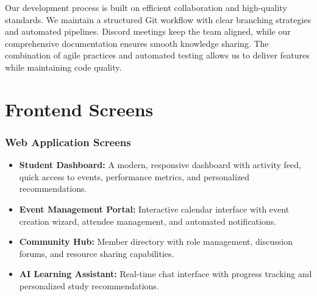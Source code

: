 Our development process is built on efficient collaboration and high-quality standards. We maintain a structured Git workflow with clear branching strategies and automated pipelines. Discord meetings keep the team aligned, while our comprehensive documentation ensures smooth knowledge sharing. The combination of agile practices and automated testing allows us to deliver features while maintaining code quality.

\section{Frontend Screens}
\label{subsec:frontend_screens}

\subsubsection{Web Application Screens}
\label{subsubsec:web_screens}

\begin{itemize}
    \item \textbf{Student Dashboard:} A modern, responsive dashboard with activity feed, quick access to events, performance metrics, and personalized recommendations.
    
    \item \textbf{Event Management Portal:} Interactive calendar interface with event creation wizard, attendee management, and automated notifications.
    
    \item \textbf{Community Hub:} Member directory with role management, discussion forums, and resource sharing capabilities.
    
    \item \textbf{AI Learning Assistant:} Real-time chat interface with progress tracking and personalized study recommendations.
\end{itemize}

